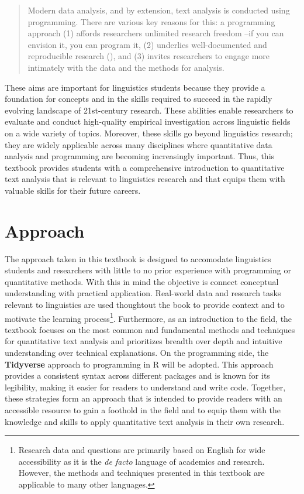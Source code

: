 \documentclass[
  letterpaper,
]{latex/krantz}
\theoremstyle{definition}
\theoremstyle{remark}
\begin{document}
\begin{quote}
Modern data analysis, and by extension, text analysis is conducted using
programming. There are various key reasons for this: a programming
approach (1) affords researchers unlimited research freedom --if you can
envision it, you can program it, (2) underlies well-documented and
reproducible research (), and
(3) invites researchers to engage more intimately with the data and the
methods for analysis.
\end{quote}

These aims are important for linguistics students because they provide a
foundation for concepts and in the skills required to succeed in the
rapidly evolving landscape of 21st-century research. These abilities
enable researchers to evaluate and conduct high-quality empirical
investigation across linguistic fields on a wide variety of topics.
Moreover, these skills go beyond linguistics research; they are widely
applicable across many disciplines where quantitative data analysis and
programming are becoming increasingly important. Thus, this textbook
provides students with a comprehensive introduction to quantitative text
analysis that is relevant to linguistics research and that equips them
with valuable skills for their future careers.

\section*{Approach}\label{sec-p-approach}


The approach taken in this textbook is designed to accomodate
linguistics students and researchers with little to no prior experience
with programming or quantitative methods. With this in mind the
objective is connect conceptual understanding with practical
application. Real-world data and research tasks relevant to linguistics
are used thoughtout the book to provide context and to motivate the
learning process\footnote{Research data and questions are primarily
  based on English for wide accessibility as it is the \emph{de facto}
  language of academics and research. However, the methods and
  techniques presented in this textbook are applicable to many other
  languages.}. Furthermore, as an introduction to the field, the
textbook focuses on the most common and fundamental methods and
techniques for quantitative text analysis and prioritizes breadth over
depth and intuitive understanding over technical explanations. On the
programming side, the
\textbf{Tidyverse} approach to
programming in R will be adopted. This approach provides a consistent
syntax across different packages and is known for its legibility, making
it easier for readers to understand and write code. Together, these
strategies form an approach that is intended to provide readers with an
accessible resource to gain a foothold in the field and to equip them
with the knowledge and skills to apply quantitative text analysis in
their own research.
\end{document}
